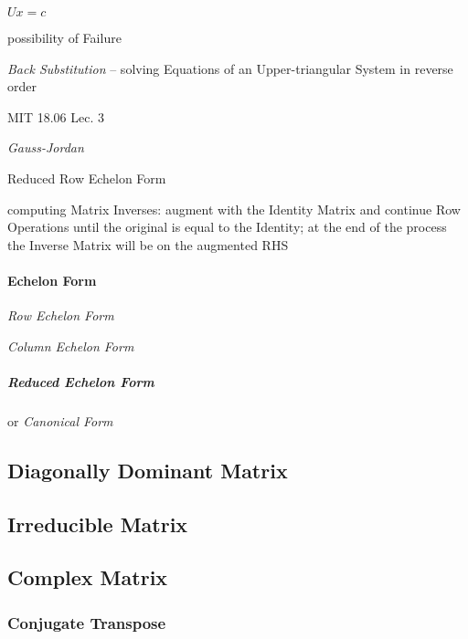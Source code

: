 $Ux = c$

possibility of Failure

\emph{Back Substitution} -- solving Equations of an Upper-triangular System in
reverse order


MIT 18.06 Lec. 3

\emph{Gauss-Jordan}

Reduced Row Echelon Form

computing Matrix Inverses: augment with the Identity Matrix and continue Row
Operations until the original is equal to the Identity; at the end of the
process the Inverse Matrix will be on the augmented RHS



\paragraph{Echelon Form}\label{sec:echelon_form}\hfill

\emph{Row Echelon Form}

\emph{Column Echelon Form}



\subparagraph{Reduced Echelon Form}\label{sec:reduced_echelon}\hfill

or \emph{Canonical Form}



\subsection{Diagonally Dominant Matrix}\label{sec:diagonally_dominant}

\subsection{Irreducible Matrix}\label{sec:irreducible_matrix}

\subsection{Complex Matrix}\label{sec:complex_matrix}

\subsubsection{Conjugate Transpose}\label{sec:conjugate_transpose}

